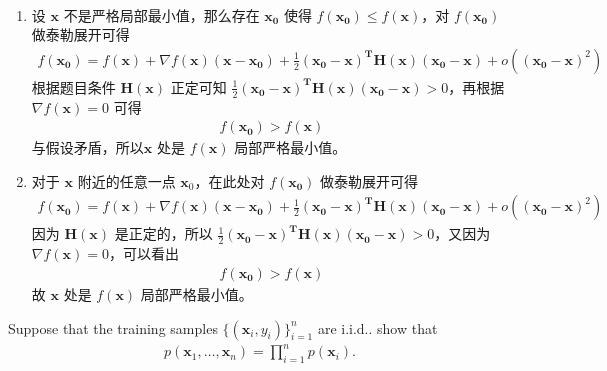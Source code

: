 \documentclass[11pt,letter,notitlepage]{article}
\begin{document}
\begin{solution}
	\heiti
	\ \\
	\begin{enumerate}
		\item 设 $\mathbf{x}$ 不是严格局部最小值，那么存在 $\mathbf{x_0}$ 使得 $f(\mathbf{x_0}) \leq f(\mathbf{x})$，对 $f(\mathbf{x_0})$ 做泰勒展开可得
			\begin{align*}
				f(\mathbf{x_0}) = f(\mathbf{x}) + \nabla f(\mathbf{x})(\mathbf{x} - \mathbf{x_0}) + \frac{1}{2}(\mathbf{x_0} - \mathbf{x})^\mathbf{T}\mathbf{H}(\mathbf{x})(\mathbf{x_0} - \mathbf{x}) + o((\mathbf{x_0} - \mathbf{x})^2)
			\end{align*}
		根据题目条件 $\mathbf{H}(\mathbf{x})$ 正定可知 $\frac{1}{2}(\mathbf{x_0} - \mathbf{x})^\mathbf{T}\mathbf{H}(\mathbf{x})(\mathbf{x_0} - \mathbf{x}) > 0$，再根据$\nabla f(\mathbf{x})=0$ 可得
			\begin{align*}
				f(\mathbf{x_0}) > f(\mathbf{x})
			\end{align*}
		与假设矛盾，所以$\mathbf{x}$ 处是 $f(\mathbf{x})$ 局部严格最小值。
		\item 对于 $\mathbf{x}$ 附近的任意一点 $\mathbf{x}_0$，在此处对 $f(\mathbf{\mathbf{x}_0})$ 做泰勒展开可得
			\begin{align*}
				f(\mathbf{x_0}) = f(\mathbf{x}) + \nabla f(\mathbf{x})(\mathbf{x} - \mathbf{x_0}) + \frac{1}{2}(\mathbf{x_0} - \mathbf{x})^\mathbf{T}\mathbf{H}(\mathbf{x})(\mathbf{x_0} - \mathbf{x}) + o((\mathbf{x_0} - \mathbf{x})^2)
			\end{align*}
			因为 $\mathbf{H}(\mathbf{x})$ 是正定的，所以 $\frac{1}{2}(\mathbf{x_0} - \mathbf{x})^\mathbf{T}\mathbf{H}(\mathbf{x})(\mathbf{x_0} - \mathbf{x}) > 0$，又因为 $\nabla f(\mathbf{x})=0$，可以看出
				\begin{align*}
					f(\mathbf{x_0}) > f(\mathbf{x})
				\end{align*}
			故 $\mathbf{x}$ 处是 $f(\mathbf{x})$ 局部严格最小值。
	\end{enumerate}

\end{solution}
\newpage

\begin{exercise}
	Suppose that the training samples $\{(\mathbf{x}_i,y_i)\}_{i=1}^n$ are i.i.d.. show that
	\begin{align*}
	    p(\mathbf{x}_1,\ldots,\mathbf{x}_n)=\prod_{i=1}^np(\mathbf{x}_i).
	\end{align*}
	
\end{exercise}
\end{document}
